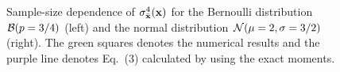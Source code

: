 \documentclass[a4paper]{article}
\newcommand{\xb}{\bar{\bf x}}
\begin{document}
\begin{figure}
  \begin{center}
  \end{center}
  \caption{Sample-size dependence of $\sigma_{\xb}^4({\bf x})$ for the Bernoulli distribution ${\cal B}(p=3/4)$ (left) and the normal distribution ${\cal N}(\mu=2,\sigma=3/2)$ (right). The green squares denotes the numerical results and the purple line denotes Eq.~(3) calculated by using the exact moments.}
\end{figure}
\end{document}
